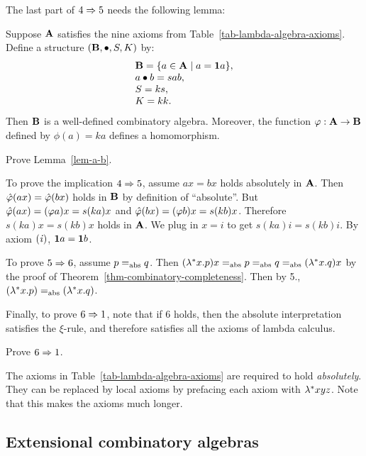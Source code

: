 \documentclass{article}
\begin{document}
The last part of $4\Rightarrow 5$ needs the following lemma:

\begin{lemma}\label{lem-a-b}
  Suppose ${\bf A}$ satisfies the nine axioms from
  Table~\ref{tab-lambda-algebra-axioms}. Define a structure
  $({\bf B},\bullet,S,K)$ by:
  \[ \begin{array}{lll}
    {\bf B} = \{a\in{\bf A}\mid a={\bf 1} a\},\\
    a\bullet b = sab,\\
    S=ks,\\
    K=kk.
  \end{array}
  \]
  Then ${\bf B}$ is a well-defined combinatory algebra. Moreover, the
  function $\varphi:{\bf A}\to{\bf B}$ defined by $\phi(a)=ka$ defines a
  homomorphism.
\end{lemma}

\begin{exercise}
  Prove Lemma~\ref{lem-a-b}.
\end{exercise}

To prove the implication $4\Rightarrow 5$, assume $ax=bx$ holds absolutely in
${\bf A}$. Then $\hat{\varphi}(ax)=\hat{\varphi}(bx)$ holds in ${\bf B}$ by definition of
``absolute''. But $\hat{\varphi}(ax) = (\varphi a)x = s(ka)x$ and $\hat{\varphi}(bx)
= (\varphi b)x = s(kb)x$. Therefore $s(ka)x=s(kb)x$ holds in ${\bf A}$. We
plug in $x=i$ to get $s(ka)i=s(kb)i$. By axiom $({\it i}\/)$, ${\bf 1} a={\bf 1} b$.

To prove $5\Rightarrow 6$, assume $p=_{\rm abs} q$. Then $(\lambda^*x.p)x =_{\rm abs}
p=_{\rm abs} q =_{\rm abs} (\lambda^*x.q)x$ by the proof of
Theorem~\ref{thm-combinatory-completeness}. Then by 5.,
$(\lambda^*x.p)=_{\rm abs} (\lambda^*x.q)$.

Finally, to prove $6\Rightarrow 1$, note that if $6$ holds, then the absolute
interpretation satisfies the $\xi$-rule, and therefore satisfies all
the axioms of lambda calculus.

\begin{exercise}
  Prove $6\Rightarrow 1$.
\end{exercise}

\begin{remark}
  The axioms in Table~\ref{tab-lambda-algebra-axioms} are required to
  hold {\em absolutely}. They can be replaced by local axioms by
  prefacing each axiom with $\lambda^*xyz$. Note that this makes the
  axioms much longer.
\end{remark}

\subsection{Extensional combinatory algebras}
\label{subsec-extensional-combinatory}
\end{document}

